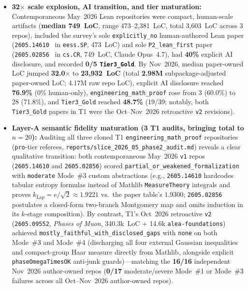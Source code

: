 \documentclass[11pt,letterpaper]{article}
\begin{document}
\begin{itemize}
  \item \textbf{32$\times$ scale explosion, AI transition, and tier maturation:} Contemporaneous May~2026 Lean repositories were compact, human-scale artifacts (\textbf{median 749~LoC}, range 473--2,381~LoC, total 3,603~LoC across 3 repos), included the survey's sole \texttt{explicitly\_no} human-authored Lean paper (\texttt{2605.14610}~\cite{arxiv2605_14610} in \texttt{eess.SP}, 473~LoC) and sole \texttt{P2\_lean\_first} paper (\texttt{2605.02856}~\cite{arxiv2605_02856} in \texttt{cs.CR}, 749~LoC, Claude Opus~4.7), had \textbf{40\%} explicit AI disclosure, and recorded \textbf{0/5 \texttt{Tier3\_Gold}}. By Nov~2026, median paper-owned LoC jumped \textbf{32.0$\times$} to \textbf{23,932~LoC} (total \textbf{2.98M} subpackage-adjusted paper-owned LoC; 4.17M raw repo LoC), explicit AI disclosure reached \textbf{76.9\%} (0\% human-only), \texttt{engineering\_math\_proof} rose from 3 (60.0\%) to 28 (71.8\%), and \texttt{Tier3\_Gold} reached \textbf{48.7\%} (19/39; notably, both \texttt{Tier3\_Gold} papers in T1 were the Oct--Nov~2026 retroactive \texttt{v2} revisions).
  \item \textbf{Layer-A semantic fidelity maturation (3 T1 audits, bringing total to $n=20$):} Auditing all three cloned T1 \texttt{engineering\_math\_proof} repositories (\texttt{pro}-tier referees, \texttt{reports/slice\_2026\_05\_phase2\_audit.md}) reveals a clear qualitative transition: both contemporaneous May~2026 \texttt{v1} repos (\texttt{2605.14610} and \texttt{2605.02856}) scored \texttt{partial\_or\_weakened\_formalization} with \texttt{moderate} Mode~\#3 custom abstractions (e.g., \texttt{2605.14610} hardcodes tabular entropy formulas instead of Mathlib \texttt{MeasureTheory} integrals and proves $k_{\text{Lap}}=e/\sqrt{2}\approx 1.9221$ vs.\ the paper table's $1.9300$; \texttt{2605.02856} postulates a closed-form two-branch Montgomery map and omits induction in its $k$-stage composition). By contrast, T1's Oct~2026 retroactive \texttt{v2} (\texttt{2605.09552}, \emph{Phases of Muon}, 340.3k~LoC + 14.6k \texttt{alea-foundations}) achieved \texttt{mostly\_faithful\_with\_disclosed\_gaps} with \texttt{none} on both Mode~\#3 and Mode~\#4 (discharging all four external Gaussian inequalities and compact-group Haar measure directly from Mathlib, alongside explicit \texttt{phaseOmegaTimesOK} anti-junk guards)---matching the \textbf{16/16} independent Nov~2026 author-owned repos (\textbf{0/17} moderate/severe Mode~\#1 or Mode~\#3 failures across all Oct--Nov~2026 author-owned repos).
\end{itemize}
\end{document}
